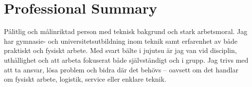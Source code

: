 \section{Professional Summary}
Pålitlig och målinriktad person med teknisk bakgrund och stark arbetsmoral. Jag har gymnasie- och universitetsutbildning inom teknik samt erfarenhet av både praktiskt och fysiskt arbete. Med svart bälte i jujutsu är jag van vid disciplin, uthållighet och att arbeta fokuserat både självständigt och i grupp. Jag trivs med att ta ansvar, lösa problem och bidra där det behövs – oavsett om det handlar om fysiskt arbete, logistik, service eller enklare teknik.

